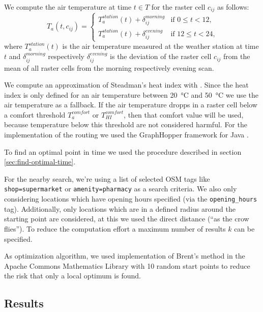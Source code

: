 We compute the air temperature at time $t\in T$ for the raster cell $c_{ij}$ as follows:
\begin{equation}
\label{eq:derived-temperature}
T_a(t, c_{ij}) = \begin{cases}
T_{a}^{station}(t) + \delta_{ij}^{morning} & \text{if $0 \leq t < 12$,}\\
T_{a}^{station}(t) + \delta_{ij}^{evening} & \text{if $12 \leq t < 24$,}
\end{cases}
\end{equation}
where $T_{a}^{station}(t)$ is the air temperature measured at the weather station at time $t$ and $\delta^{morning}_{ij}$ respectively  $\delta^{evening}_{ij}$ is the deviation of the raster cell $c_{ij}$ from the mean of all raster cells from the morning respectively evening scan.

We compute an approximation of Steadman's heat index with \textcite[77]{Stull2011}. Since the heat index is only defined for an air temperature between \SI{20}{\celsius} and \SI{50}{\celsius} we use the air temperature as a fallback. If the air temperature dropps in a raster cell below a comfort threshold $T_a^{comfort}$ or $T_{HI}^{comfort}$, then that comfort value will be used, because temperature below this threshold are not considered harmful. 
For the implementation of the routing we used the GraphHopper framework for Java \parencite{GraphHopper2016,GraphHopper2016a}.


To find an optimal point in time we used the procedure described in section \ref{sec:find-optimal-time}. 

For the nearby search,  we're using a list of selected OSM tags like \verb|shop=supermarket| or \verb|amenity=pharmacy| as a search criteria. We also only considering locations which have opening hours specified (via the \verb|opening_hours| tag). Additionally, only locations which are in a defined radius around the starting point are considered, at this we used the direct distance (“as the crow flies”). To reduce the computation effort a maximum number of results $k$ can be specified.

As optimization algorithm, we used implementation of Brent's method in the Apache Commons Mathematics Library \parencite{ASF2016} with 10 random start points to reduce the risk that only a local optimum is found.

\subsection{Results}


